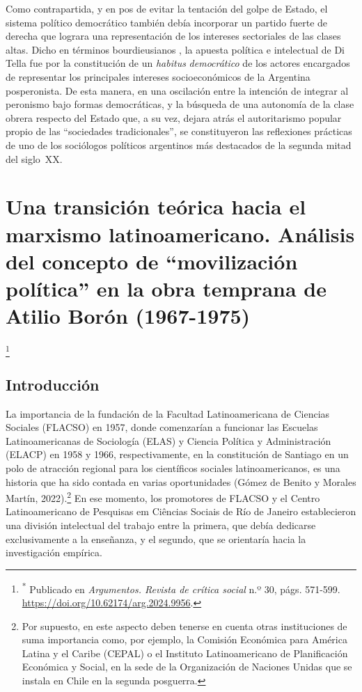 Como contrapartida, y en pos de evitar la tentación del golpe de Estado, el sistema político democrático también debía incorporar un partido fuerte de derecha que lograra una representación de los intereses sectoriales de las clases altas. Dicho en términos bourdieusianos \parencite{1579-BOURDIEU2007}, la apuesta política e intelectual de Di Tella fue por la constitución de un \emph{habitus} \emph{democrático} de los actores encargados de representar los principales intereses socioeconómicos de la Argentina posperonista. De esta manera, en una oscilación entre la intención de integrar al peronismo bajo formas democráticas, y la búsqueda de una autonomía de la clase obrera respecto del Estado que, a su vez, dejara atrás el autoritarismo popular propio de las \enquote{sociedades tradicionales}, se constituyeron las reflexiones prácticas de uno de los sociólogos políticos argentinos más destacados de la segunda mitad del siglo~XX.

\chapter{Una transición teórica hacia el marxismo latinoamericano. Análisis del concepto de \enquote{movilización política} en la obra temprana de Atilio Borón (1967-1975)}

\footnote{\textsuperscript{*} Publicado en \emph{Argumentos. Revista de crítica social} n.º 30, págs. 571-599. \url{https://doi.org/10.62174/arg.2024.9956}.}

\section{Introducción}

La importancia de la fundación de la Facultad Latinoamericana de Ciencias Sociales (FLACSO) en 1957, donde comenzarían a funcionar las Escuelas Latinoamericanas de Sociología (ELAS) y Ciencia Política y Administración (ELACP) en 1958 y 1966, respectivamente, en la constitución de Santiago en un polo de atracción regional para los científicos sociales latinoamericanos, es una historia que ha sido contada en varias oportunidades \parencite{1523-BEIGEL2009,1538-PEREZBRIGNOLI2008,1625-FRANCO2007}(Gómez de Benito y Morales Martín, 2022).\footnote{Por supuesto, en este aspecto deben tenerse en cuenta otras instituciones de suma importancia como, por ejemplo, la Comisión Económica para América Latina y el Caribe (CEPAL) o el Instituto Latinoamericano de Planificación Económica y Social, en la sede de la Organización de Naciones Unidas que se instala en Chile en la segunda posguerra.} En ese momento, los promotores de FLACSO y el Centro Latinoamericano de Pesquisas em Ciências Sociais de Río de Janeiro establecieron una división intelectual del trabajo entre la primera, que debía dedicarse exclusivamente a la enseñanza, y el segundo, que se orientaría hacia la investigación empírica.

